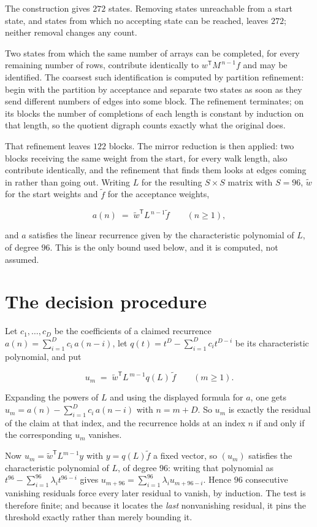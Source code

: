 \documentclass[11pt]{article}
\theoremstyle{definition}
\begin{document}
The construction gives $272$ states. Removing states unreachable from a start state, and states from which no accepting state can be reached, leaves $272$; neither removal changes any count.

Two states from which the same number of arrays can be completed, for every remaining number of rows, contribute identically to $w^{\mathsf T}M^{\,n-1}f$ and may be identified. The coarsest such identification is computed by partition refinement: begin with the partition by acceptance and separate two states as soon as they send different numbers of edges into some block. The refinement terminates; on its blocks the number of completions of each length is constant by induction on that length, so the quotient digraph counts exactly what the original does.

That refinement leaves $122$ blocks. The mirror reduction is then applied: two blocks receiving the same weight from the start, for every walk length, also contribute identically, and the refinement that finds them looks at edges coming in rather than going out. Writing $L$ for the resulting $S \times S$ matrix with $S = 96$, $\tilde w$ for the start weights and $\tilde f$ for the acceptance weights,

\[a(n) \;=\; \tilde w^{\mathsf T} L^{\,n-1} \tilde f \qquad (n \ge 1),\]

and $a$ satisfies the linear recurrence given by the characteristic polynomial of $L$, of degree $96$. This is the only bound used below, and it is computed, not assumed.

\section{The decision procedure}

Let $c_1,\dots,c_D$ be the coefficients of a claimed recurrence $a(n) = \sum_{i=1}^{D} c_i\,a(n-i)$, let $q(t) = t^{D} - \sum_{i=1}^{D} c_i t^{D-i}$ be its characteristic polynomial, and put

\[u_m \;=\; \tilde w^{\mathsf T} L^{\,m-1} q(L)\,\tilde f \qquad (m \ge 1).\]

Expanding the powers of $L$ and using the displayed formula for $a$, one gets $u_m = a(n) - \sum_{i=1}^{D} c_i\,a(n-i)$ with $n = m + D$. So $u_m$ is exactly the residual of the claim at that index, and the recurrence holds at an index $n$ if and only if the corresponding $u_m$ vanishes.

Now $u_m = \tilde w^{\mathsf T} L^{m-1} y$ with $y = q(L)\tilde f$ a fixed vector, so $(u_m)$ satisfies the characteristic polynomial of $L$, of degree $96$: writing that polynomial as $t^{96} - \sum_{i=1}^{96} \lambda_i t^{96-i}$ gives $u_{m+96} = \sum_{i=1}^{96} \lambda_i u_{m+96-i}$. Hence $96$ consecutive vanishing residuals force every later residual to vanish, by induction. The test is therefore finite; and because it locates the {\itshape last} nonvanishing residual, it pins the threshold exactly rather than merely bounding it.
\end{document}
